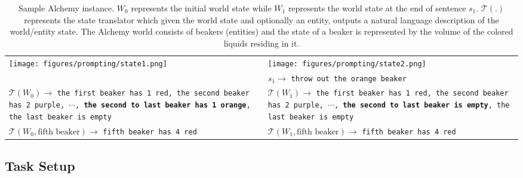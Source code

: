 \documentclass[12pt]{thesis-umich}[thesis]
\begin{document}
\begin{table*}[t]
  \centering
  \footnotesize
  \renewcommand{\arraystretch}{1.7}
  \begin{tabular}{ p{} p{} }
    \begin{minipage}{.47\textwidth}
      \texttt{[image: figures/prompting/state1.png]}
        \caption*{$W_0$}

    \end{minipage}
    &
    \begin{minipage}{.47\textwidth}
      \texttt{[image: figures/prompting/state2.png]}
      \caption*{$W_1$}
    \end{minipage}
    \\ 
    & $s_1  \rightarrow $ \texttt{throw out the orange beaker}  \\
    $\mathcal{T}(W_0) \rightarrow $  \texttt{the first beaker has 1 red, the second beaker has 2 purple, 
    $\cdots$, 
    \textbf{the second to last beaker has 1 orange}, the last beaker is empty} & 
    $\mathcal{T}(W_1) \rightarrow$   \texttt{the first beaker has 1 red, the second beaker has 2 purple,
    $\cdots$, 
    \textbf{the second to last beaker is empty}, the last beaker is empty} \\ 
    $\mathcal{T}(W_0, \textrm{fifth beaker}) \rightarrow$  \texttt{fifth beaker has 4 red} & 
    $\mathcal{T}(W_1, \textrm{fifth beaker}) \rightarrow$  \texttt{fifth beaker has 4 red}
    \\ 
    \end{tabular}
    \caption{Sample Alchemy instance. $W_0$ represents the initial world state while $W_1$ represents the world state at the end of sentence $s_1$. $\mathcal{T}(.)$ represents the state translator which given the world state and optionally an entity, outputs a natural language description of the world/entity state. The Alchemy world consists of beakers (entities) and the state of a beaker is represented by the volume of the colored liquids residing in it. }
    \label{fig:definitions}
\end{table*} \subsection{Task Setup}
\label{sec:classifier_setup}
\end{document}
